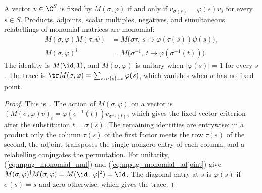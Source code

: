 \begin{lemma}
    \label{thm:mpug_monomial_matrix_laws}
    \leanok
    A vector $v\in\C^S$ is fixed by $M(\sigma,\varphi)$ if and only if
    $v_{\sigma(s)}=\varphi(s)v_s$ for every $s\in S$. Products, adjoints,
    scalar multiples, negatives, and simultaneous relabellings of monomial
    matrices are monomial:
    \begin{align}
        M(\sigma,\varphi)M(\tau,\psi)
         & =M\bigl(\sigma\tau,\ s\mapsto\varphi(\tau(s))\psi(s)\bigr),
        \label{eq:mpug_monomial_mul}                                               \\
        M(\sigma,\varphi)^\dagger
         & =M\bigl(\sigma^{-1},\ t\mapsto\overline{\varphi(\sigma^{-1}(t))}\bigr).
        \label{eq:mpug_monomial_adjoint}
    \end{align}
    The identity is $M(\id,1)$, and $M(\sigma,\varphi)$ is unitary when
    $|\varphi(s)|=1$ for every $s$. The trace is
    $\tr M(\sigma,\varphi)=\sum_{s:\,\sigma(s)=s}\varphi(s)$, which vanishes
    when $\sigma$ has no fixed point.
\end{lemma}

\begin{proof}\leanok
    This is~\cite[``Calculus of monomial matrices'']{QICLean2026Blueprint}.
    The action of $M(\sigma,\varphi)$ on a vector is
    $(M(\sigma,\varphi)v)_t=\varphi(\sigma^{-1}(t))v_{\sigma^{-1}(t)}$, which
    gives the fixed-vector criterion after the substitution $t=\sigma(s)$.
    The remaining identities are entrywise: in a product only the column
    $\tau(s)$ of the first factor meets the row $\tau(s)$ of the second, the
    adjoint transposes the single nonzero entry of each column, and a
    relabelling conjugates the permutation. For unitarity,
    (\ref{eq:mpug_monomial_mul}) and (\ref{eq:mpug_monomial_adjoint}) give
    $M(\sigma,\varphi)^\dagger M(\sigma,\varphi)=M(\id,|\varphi|^2)=\Id$.
    The diagonal entry at $s$ is $\varphi(s)$ if $\sigma(s)=s$ and zero
    otherwise, which gives the trace.
\end{proof}

